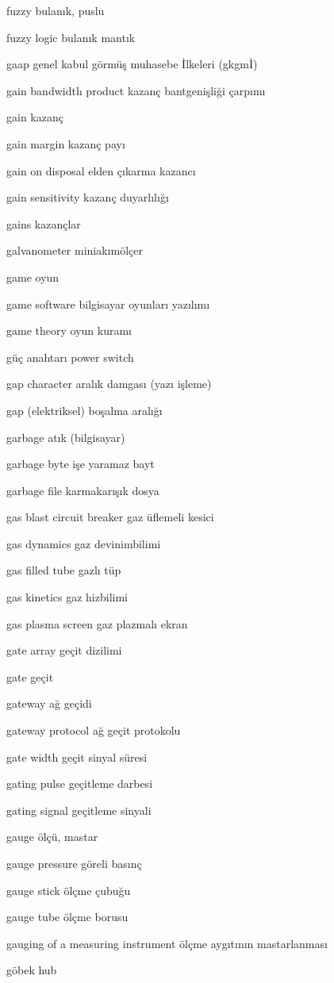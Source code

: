 \documentclass[12pt,fleqn]{article}\usepackage{../../common}
\begin{document}
fuzzy bulanık, puslu

fuzzy logic bulanık mantık

gaap genel kabul görmüş muhasebe İlkeleri (gkgmİ)

gain bandwidth product kazanç bantgenişliği çarpımı

gain kazanç

gain margin kazanç payı

gain on disposal elden çıkarma kazancı

gain sensitivity kazanç duyarlılığı

gains kazançlar

galvanometer miniakımölçer

game oyun

game software bilgisayar oyunları yazılımı

game theory oyun kuramı

güç anahtarı power switch

gap character aralık damgası (yazı işleme)

gap (elektriksel) boşalma aralığı

garbage atık (bilgisayar)

garbage byte işe yaramaz bayt

garbage file karmakarışık dosya

gas blast circuit breaker gaz üflemeli kesici

gas dynamics gaz devinimbilimi

gas filled tube gazlı tüp

gas kinetics gaz hizbilimi

gas plasma screen gaz plazmalı ekran

gate array geçit dizilimi

gate geçit

gateway ağ geçidi

gateway protocol ağ geçit protokolu

gate width geçit sinyal süresi

gating pulse geçitleme darbesi

gating signal geçitleme sinyali

gauge ölçü, mastar

gauge pressure göreli basınç

gauge stick ölçme çubuğu

gauge tube ölçme borusu

gauging of a measuring instrument ölçme aygıtının mastarlanması

göbek hub
\end{document}
